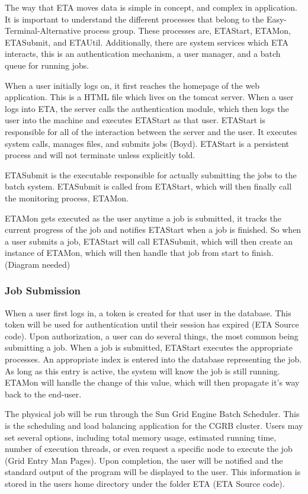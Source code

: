 \documentclass[a4paper,12pt]{article}
\begin{document}
 The way that ETA moves data is simple in concept, and complex in application. It is important to understand the different processes that belong to the Easy-Terminal-Alternative process group. These processes are, ETAStart, ETAMon, ETASubmit, and ETAUtil. Additionally, there are system services which ETA interacts, this is an authentication mechanism, a user manager, and a batch queue  for running jobs.
 
 When a user initially logs on, it first reaches the homepage of the web application. This is a HTML file which lives on the tomcat server. When a user logs into ETA, the server calls the authentication module, which then logs the user into the machine and executes ETAStart as that user. ETAStart is responsible for all of the interaction between the server and the user. It executes system calls, manages files, and submits jobs (Boyd). ETAStart is a persistent process and will not terminate unless explicitly told. 
 
 ETASubmit is the executable responsible for actually submitting the jobs to the batch system. ETASubmit is called from ETAStart, which will then finally call the monitoring process, ETAMon.
 
 ETAMon gets executed as the user anytime a job is submitted, it tracks the current progress of the job and notifies ETAStart when a job is finished. So when a user submits a job, ETAStart will call ETASubmit, which will then create an instance of ETAMon, which will then handle that job from start to finish.
 (Diagram needed) 
 \subsubsection{Job Submission}
 When a user first logs in, a token is created for that user in the database. This token will be used for authentication until their session has expired (ETA Source code). Upon authorization, a user can do several things, the most common being submitting a job. When a job is submitted, ETAStart executes the appropriate processes. An appropriate index is entered into the database representing the job. As long as this entry is active, the system will know the job is still running. ETAMon will handle the change of this value, which will then propagate it's way back to the end-user.
 
 The physical job will be run through the Sun Grid Engine Batch Scheduler. This is the scheduling and load balancing application for the CGRB cluster. Users may set several options, including total memory usage, estimated running time, number of execution threads, or even request a specific node to execute the job (Grid Entry Man Pages). Upon completion, the user will be notified and the standard output of the program will be displayed to the user. This information is stored in the users home directory under the folder ETA (ETA Source code). 
\end{document}
